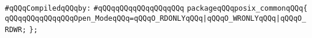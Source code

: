 \label{src/lib/std/src/posix/posix-common.pkg}
\newline
\verb|#qQQqCompiledqQQqby:|\newline
\verb|#qQQqqQQqqQQqqQQqqQQq|\newline
\newline
\verb|packageqQQqposix_commonqQQq{|\newline
\newline
\verb|qQQqqQQqqQQqqQQqOpen_ModeqQQq=qQQqO_RDONLYqQQq|\verb#|qQQqO_WRONLYqQQq|qQQqO_RDWR;#\newline
\verb|};|\newline

